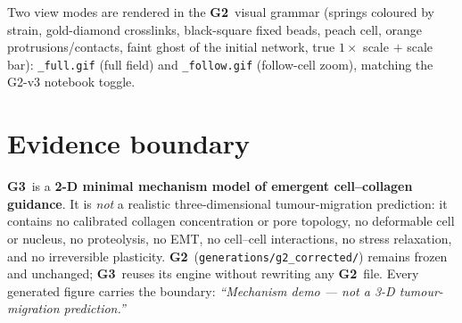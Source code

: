 \documentclass[11pt]{article}
\newcommand{\GTwo}{\textcolor{g2col}{\textbf{G2}}}
\newcommand{\GThree}{\textcolor{g3col}{\textbf{G3}}}
\newcommand{\code}[1]{\texttt{\small #1}}
\begin{document}
Two view modes are rendered in the \GTwo\ visual grammar (springs coloured by strain, gold-diamond
crosslinks, black-square fixed beads, peach cell, orange protrusions/contacts, faint ghost of the
initial network, true $1\times$ scale $+$ scale bar): \code{*\_full.gif} (full field) and
\code{*\_follow.gif} (follow-cell zoom), matching the G2-v3 notebook toggle.

\section{Evidence boundary}

\GThree\ is a \textbf{2-D minimal mechanism model of emergent cell--collagen guidance}. It is
\emph{not} a realistic three-dimensional tumour-migration prediction: it contains no calibrated
collagen concentration or pore topology, no deformable cell or nucleus, no proteolysis, no EMT, no
cell--cell interactions, no stress relaxation, and no irreversible plasticity. \GTwo\
(\code{generations/g2\_corrected/}) remains frozen and unchanged; \GThree\ reuses its engine without
rewriting any \GTwo\ file. Every generated figure carries the boundary:
\emph{``Mechanism demo --- not a 3-D tumour-migration prediction.''}

\end{document}
